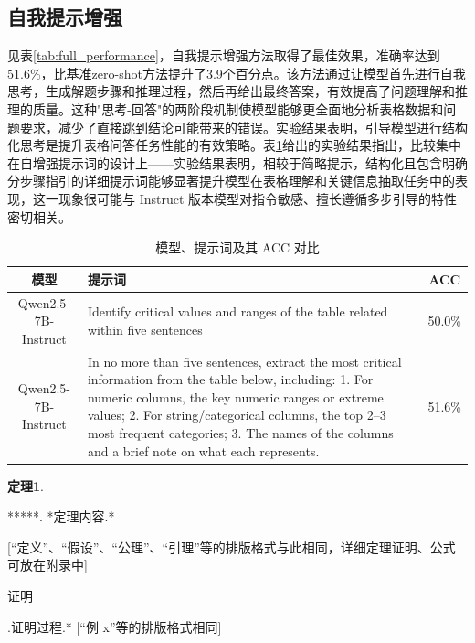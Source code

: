 \documentclass[10.5pt,compsoc]{CjC}
\theoremstyle{mystyle}
\begin{document}
\begin{CJK*}{UTF8}{zhhei}
{\begin{CJK*}{UTF8}{zhhei}\subsection{自我提示增强}\end{CJK*}}
见表\ref{tab:full_performance}，自我提示增强方法取得了最佳效果，准确率达到51.6\%，比基准zero-shot方法提升了3.9个百分点。该方法通过让模型首先进行自我思考，生成解题步骤和推理过程，然后再给出最终答案，有效提高了问题理解和推理的质量。这种"思考-回答"的两阶段机制使模型能够更全面地分析表格数据和问题要求，减少了直接跳到结论可能带来的错误。实验结果表明，引导模型进行结构化思考是提升表格问答任务性能的有效策略。表\ref{tab:model-usage-acc}给出的实验结果指出，比较集中在自增强提示词的设计上——实验结果表明，相较于简略提示，结构化且包含明确分步骤指引的详细提示词能够显著提升模型在表格理解和关键信息抽取任务中的表现，这一现象很可能与 Instruct 版本模型对指令敏感、擅长遵循多步引导的特性密切相关。
\begin{table}[t]  %
  \centering
  \begin{tabular}{c p{10cm} c}
    \toprule
    模型 & 提示词 & ACC \\ 
    \midrule
    Qwen2.5-7B-Instruct
      & Identify critical values and ranges of the table related within five sentences
      & 50.0\% \\ 
    Qwen2.5-7B-Instruct
      & In no more than five sentences, extract the most critical information from the table below, including:
          1. For numeric columns, the key numeric ranges or extreme values;
          2. For string/categorical columns, the top 2–3 most frequent categories;
          3. The names of the columns and a brief note on what each represents.
      & 51.6\% \\ 
    \bottomrule
  \end{tabular}
  \caption{模型、提示词及其 ACC 对比}
  \label{tab:model-usage-acc}
\end{table}






{\begin{CJK*}{UTF8}{zhhei}\textbf{定理1}.\end{CJK*}}\quad ******. *定理内容.*

[``定义''、``假设''、``公理''、``引理''等的排版格式与此相同，详细定理证明、公式可放在附录中]

{\begin{CJK*}{UTF8}{song}证明\end{CJK*}}.\quad  *证明过程.* [``例 x''等的排版格式相同]


\end{CJK*}
\end{document}
